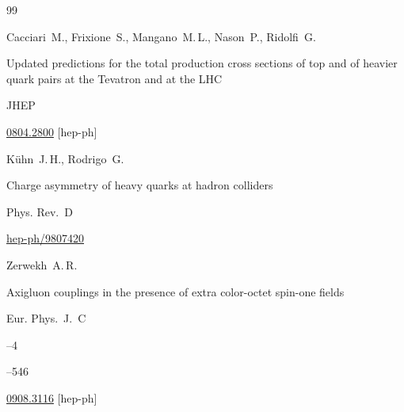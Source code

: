 \begin{thebibliography}{99}




\by Cacciari~M., Frixione~S., Mangano~M.\,L., Nason~P.,   Ridolfi~G.

\paper Updated predictions for the total   production cross sections of top and of heavier quark pairs at the Tevatron   and at the LHC

\jour JHEP






\arxiv \href{http://arxiv.org/abs/0804.2800}{0804.2800} [hep-ph]





\by K\"uhn~J.\,H., Rodrigo~G.

\paper Charge asymmetry of heavy quarks at hadron colliders

\jour Phys. Rev.~D






\arxiv \href{http://arxiv.org/abs/hep-ph/9807420}{hep-ph/9807420}





\by  Zerwekh~A.\,R.

\paper Axigluon couplings in the presence of extra color-octet spin-one fields 

\jour Eur. Phys.~J.~C



--4

--546

\arxiv \href{http://arxiv.org/abs/0908.3116}{0908.3116} [hep-ph]






\end{thebibliography}
